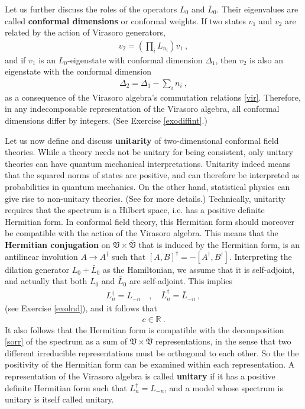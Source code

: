 \documentclass[12pt, a4paper, notitlepage, twoside]{report}
\numberwithin{equation}{section}
\theoremstyle{break}
\begin{document}
Let us further discuss the roles of the operators $L_0$ and $\bar L_0$. Their eigenvalues are called \textbf{\boldmath conformal dimensions} or conformal weights. If 
two states $v_1$ and $v_2$ are related by the action of Virasoro generators,
\begin{align}
 v_2 = \left(\prod_i L_{n_i}\right) v_1\ ,
\label{vovt}
\end{align}
and if $v_1$ is an $L_0$-eigenstate with conformal dimension $\Delta_1$, then $v_2$ is also an eigenstate with the conformal dimension
\begin{align}
 \Delta_2 = \Delta_1 - \sum_i n_i\ ,
\label{ddsn}
\end{align}
as a consequence of the Virasoro algebra's commutation relations \eqref{vir}. Therefore, in any indecomposable representation of the Virasoro algebra, all conformal dimensions differ by integers. (See Exercise \ref{exodiffint}.)

Let us now define and discuss \textbf{\boldmath unitarity} of two-dimensional conformal field theories. While a theory needs not be unitary for being consistent, only unitary theories can have quantum mechanical interpretations. Unitarity indeed means that the squared norms of states are positive, and can therefore be interpreted as probabilities in quantum mechanics. On the other hand, statistical physics can give rise to non-unitary theories. (See \cite{prv18} for more details.) Technically, unitarity requires that 
the spectrum is a Hilbert space, i.e. has a positive definite Hermitian form. 
In conformal field theory, this Hermitian form should moreover be compatible with the action of the Virasoro algebra.
This means that the \textbf{Hermitian conjugation} on $\mathfrak{V}\times\overline{\mathfrak{V}}$ that is induced by the Hermitian form, is an antilinear involution $A\to A^\dagger$ such that $[A,B]^\dagger = -[A^\dagger, B^\dagger]$.
Interpreting the dilation generator $L_0+\bar L_0$ as the Hamiltonian, we assume that it is self-adjoint, and actually that both $L_0$ and $\bar L_0$ are self-adjoint.
This implies
\begin{align}
 L^\dagger_n = L_{-n} \quad , \quad \bar L_n^\dagger = \bar L_{-n}\ ,
\label{ldn}
\end{align}
(see Exercise \ref{exolnd}), and it follows that
\begin{align}
 c\in {\mathbb{R}}\ .
\label{cir}
\end{align}
It also follows that the Hermitian form is compatible with the decomposition \eqref{sorr} of the spectrum as a sum of $\mathfrak{V}\times \overline{\mathfrak{V}}$ representations, in the sense that two different irreducible representations must be orthogonal to each other.
So the the positivity of the Hermitian form can be examined within each representation.
A representation of the Virasoro algebra is called \textbf{\boldmath unitary} if it has a positive definite Hermitian form such that 
$L^\dagger_n = L_{-n}$, and a model whose spectrum is unitary is itself called unitary. 
\end{document}
